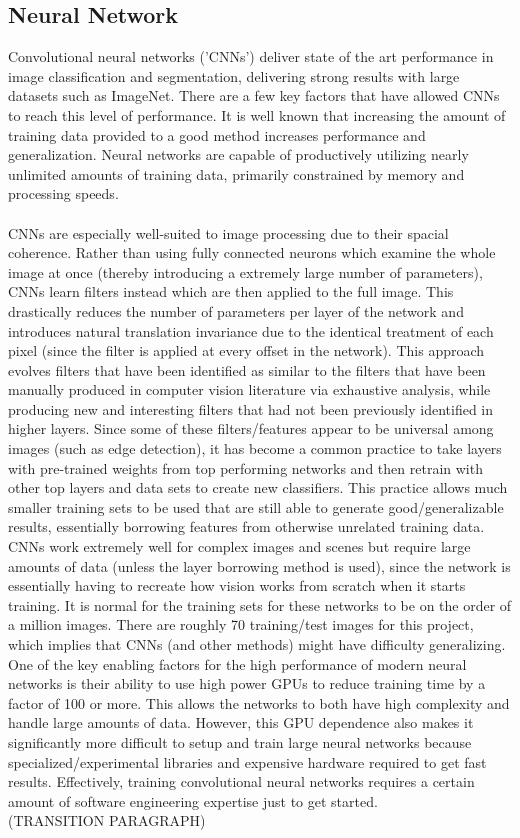 \documentclass[12pt]{article}
\begin{document}
\subsection{Neural Network}
Convolutional neural networks ('CNNs') deliver state of the art performance in image classification and segmentation, delivering strong results with large datasets such as ImageNet.  There are a few key factors that have allowed CNNs to reach this level of performance.  It is well known that increasing the amount of training data provided to a good method increases performance and generalization.  Neural networks are capable of productively utilizing nearly unlimited amounts of training data, primarily constrained by memory and processing speeds.\\
\\
CNNs are especially well-suited to image processing due to their spacial coherence.  Rather than using fully connected neurons which examine the whole image at once (thereby introducing a extremely large number of parameters), CNNs learn filters instead which are then applied to the full image.  This drastically reduces the number of parameters per layer of the network and introduces natural translation invariance due to the identical treatment of each pixel (since the filter is applied at every offset in the network).  This approach evolves filters that have been identified as similar to the filters that have been manually produced in computer vision literature via exhaustive analysis, while producing new and interesting filters that had not been previously identified in higher layers.  Since some of these filters/features appear to be universal among images (such as edge detection), it has become a common practice to take layers with pre-trained weights from top performing networks and then retrain with other top layers and data sets to create new classifiers.  This practice allows much smaller training sets to be used that are still able to generate good/generalizable results, essentially borrowing features from otherwise unrelated training data.
\\
CNNs work extremely well for complex images and scenes but require large amounts of data (unless the layer borrowing method is used), since the network is essentially having to recreate how vision works from scratch when it starts training.  It is normal for the training sets for these networks to be on the order of a million images.  There are roughly 70 training/test images for this project, which implies that CNNs (and other methods) might have difficulty generalizing.
\\
One of the key enabling factors for the high performance of modern neural networks is their ability to use high power GPUs to reduce training time by a factor of 100 or more.  This allows the networks to both have high complexity and handle large amounts of data.  However, this GPU dependence also makes it significantly more difficult to setup and train large neural networks because specialized/experimental libraries and expensive hardware required to get fast results.  Effectively, training convolutional neural networks requires a certain amount of software engineering expertise just to get started.\\
(TRANSITION PARAGRAPH)
\end{document}
